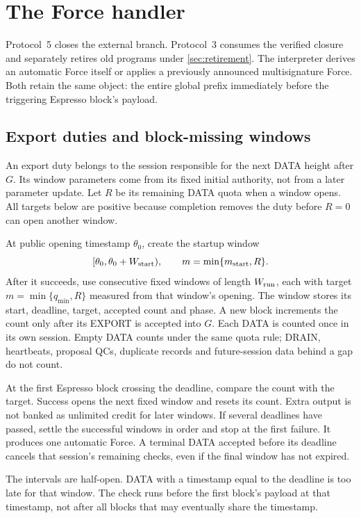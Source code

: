 \documentclass[11pt,a4paper]{article}
\begin{document}


\section{The Force handler}
\label{sec:force}
Protocol~5 closes the external branch. Protocol~3 consumes the verified
closure and separately retires old programs under \cref{sec:retirement}. The interpreter derives an automatic Force itself
or applies a previously announced multisignature Force.
Both retain the same object: the entire global prefix immediately
before the triggering Espresso block's payload.

\subsection{Export duties and block-missing windows}
\label{sec:windows}
An export duty belongs to the session responsible for the next DATA
height after $G$. Its window parameters come from its fixed initial
authority, not from a later parameter update.
Let $R$ be its remaining DATA quota when a window opens. All targets
below are positive because completion removes the duty before $R=0$
can open another window.

At public opening timestamp $\theta_0$, create the startup window
\[
 [\theta_0,\theta_0+W_{\rm start}),\qquad
 m=\min\{m_{\rm start},R\}.
\]
After it succeeds, use consecutive fixed windows of length
$W_{\rm run}$, each with target $m=\min\{q_{\min},R\}$ measured from
that window's opening. The window stores its start, deadline, target,
accepted count and phase. A new block increments the count only after
its EXPORT is accepted into $G$. Each DATA is counted once in its own
session. Empty DATA counts under the same quota rule; DRAIN, heartbeats,
proposal QCs, duplicate records and future-session data behind a gap
do not count.

At the first Espresso block crossing the deadline, compare the count
with the target. Success opens the next fixed window and resets its
count. Extra output is not banked as unlimited credit for later windows.
If several deadlines have passed, settle the successful windows in
order and stop at the first failure. It produces one automatic Force.
A terminal DATA accepted before its deadline cancels that session's
remaining checks, even if the final window has not expired.

The intervals are half-open. DATA with a timestamp equal to the
deadline is too late for that window. The check runs before the first
block's payload at that timestamp, not after all blocks that may
eventually share the timestamp.
\end{document}
